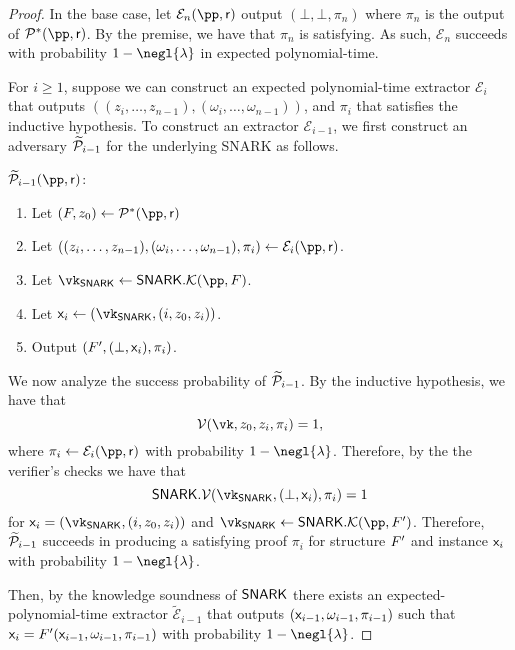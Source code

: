\begin{proof}
   
   In the base case,
   let $\mathcal{E}_n(\pp, \mathsf{r})$ 
   output 
   $(\bot, \bot, \pi_n)$ 
   where $\pi_n$ is the output of 
   $\Po^*(\pp, \mathsf{r})$.
   By the premise,
   we have that $\pi_n$ is satisfying.
   As such,
   $\mathcal{E}_n$ succeeds with probability $1 - \negl{\lambda}$ in expected polynomial-time.
   
   For $i \geq 1$, 
   suppose we can construct an expected polynomial-time extractor 
   $\mathcal{E}_i$ 
   that outputs
   $((z_i, \ldots, z_{n - 1}), (\omega_i, \ldots, \omega_{n - 1}))$, 
   and $\pi_i$ 
   that satisfies the inductive hypothesis.
   To construct an extractor $\mathcal{E}_{i - 1}$, 
   we first construct an adversary $\widetilde{\mathcal{P}}_{i - 1}$
   for the underlying SNARK as follows.
   \begin{mdframed}[nobreak=true]
     \noindent \underline{$\widetilde{\Po}_{i - 1}(\pp, \mathsf{r})$}: 
     \begin{enumerate}
       \item Let $(F, z_0) \gets \Po^*(\pp, \mathsf{r})$
       \item Let $((z_i, \ldots, z_{n - 1}), (\omega_i, \ldots, \omega_{n -
       1}), \pi_i) \gets \mathcal{E}_i(\pp, \mathsf{r})$.
       \item Let $\vk_{\snark} \gets \snark.\En(\pp, F)$.
       \item Let $\io_i \gets (\vk_\snark, (i, z_0, z_i))$.
       \item Output $(F', (\bot, \mathsf{x}_i), \pi_i)$.
     \end{enumerate}
   \end{mdframed}
   
   We now analyze the success probability of $\widetilde{\mathcal{P}}_{i - 1}$. 
   By the inductive hypothesis,
   we have that 
   \[
   \V(\vk, z_0, z_i, \pi_i) = 1,
   \]
   where 
   $\pi_i \gets \mathcal{E}_i(\pp, \mathsf{r})$ 
   with probability 
   $1 - \negl{\lambda}$.
   Therefore, 
   by the the verifier's checks 
   we have that
   \[
   \snark.\V(\vk_\snark, (\bot, \io_i), \pi_i) = 1
   \]
   for $\io_i = (\vk_\snark, (i, z_0, z_i))$
   and $\vk_\snark \gets \snark.\En(\pp, \FP)$.
   Therefore,
   $\widetilde{\mathcal{P}}_{i - 1}$
   succeeds in producing a satisfying proof $\pi_i$
   for structure $F'$ and instance $\mathsf{x}_i$
   with probability $1 - \negl{\lambda}$.
 
   
   Then,
   by the knowledge soundness of $\mathsf{SNARK}$
   there exists an 
   expected-polynomial-time
   extractor $\widetilde{\mathcal{E}}_{i - 1}$ that
   outputs 
   $(\mathsf{x}_{i - 1}, \omega_{i - 1}, \pi_{i - 1})$
   such that
   $\mathsf{x}_i = F'(\mathsf{x}_{i - 1}, \omega_{i - 1}, \pi_{i - 1})$
   with probability $1 - \negl{\lambda}$.
   

\end{proof}
